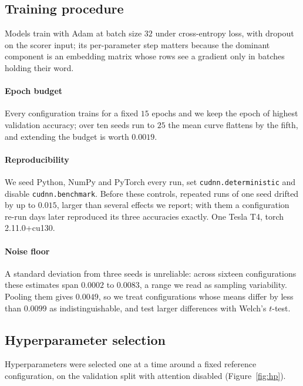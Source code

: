 \documentclass[11pt]{article}
\begin{document}
\subsection{Training procedure}
\label{sec:training}

Models train with Adam \citep{kingma2015adam} at batch size $32$ under
cross-entropy loss, with dropout on the scorer input; its per-parameter step
matters because the dominant component is an embedding matrix whose rows see
a gradient only in batches holding their word.

\paragraph{Epoch budget}
Every configuration trains for a fixed $15$ epochs and we keep the epoch of
highest validation accuracy; over ten seeds run to $25$ the mean curve
flattens by the fifth, and extending the budget is worth $0.0019$.

\paragraph{Reproducibility}
We seed Python, NumPy and PyTorch every run, set \texttt{cudnn.deterministic}
and disable \texttt{cudnn.benchmark}. Before these controls, repeated runs of
one seed drifted by up to $0.015$, larger than several effects we report;
with them a configuration re-run days later reproduced its three accuracies
exactly. One Tesla T4, torch 2.11.0+cu130.

\paragraph{Noise floor}
A standard deviation from three seeds is unreliable: across sixteen
configurations these estimates span $0.0002$ to $0.0083$, a range we read as
sampling variability. Pooling them gives $0.0049$, so we treat configurations
whose means differ by less than $0.0099$ as indistinguishable, and test larger
differences with Welch's $t$-test.

\subsection{Hyperparameter selection}
\label{sec:hparams}

Hyperparameters were selected one at a time around a fixed reference
configuration, on the validation split with attention disabled
(Figure~\ref{fig:hp}).
\end{document}
